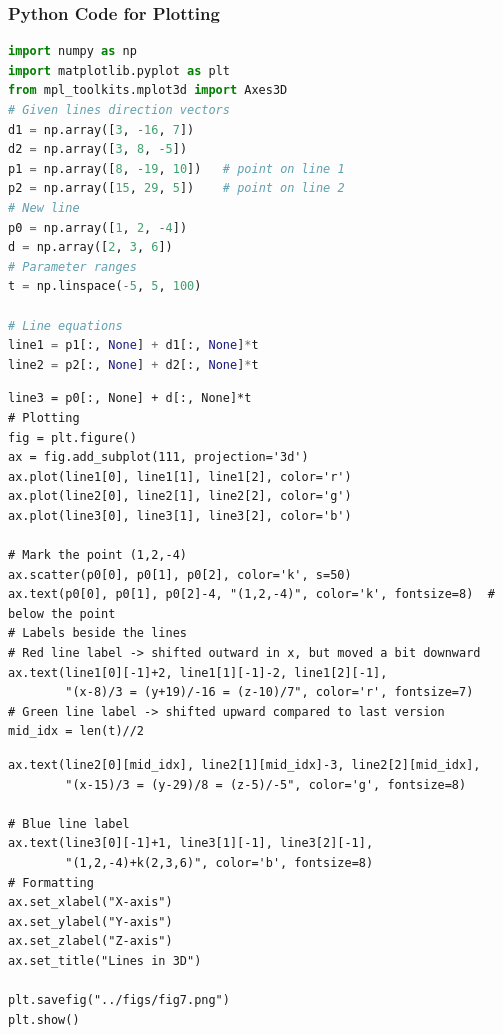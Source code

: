 \documentclass{beamer}
\theoremstyle{remark}
\numberwithin{equation}{section}
\begin{document}
\begin{frame}[fragile]
\frametitle{Python Code for Plotting}
\begin{lstlisting}[language=Python]
import numpy as np
import matplotlib.pyplot as plt
from mpl_toolkits.mplot3d import Axes3D
# Given lines direction vectors
d1 = np.array([3, -16, 7])
d2 = np.array([3, 8, -5])
p1 = np.array([8, -19, 10])   # point on line 1
p2 = np.array([15, 29, 5])    # point on line 2
# New line
p0 = np.array([1, 2, -4])
d = np.array([2, 3, 6])
# Parameter ranges
t = np.linspace(-5, 5, 100)

# Line equations
line1 = p1[:, None] + d1[:, None]*t
line2 = p2[:, None] + d2[:, None]*t
\end{lstlisting}
\end{frame}
\begin{frame}[fragile]
\begin{lstlisting}
line3 = p0[:, None] + d[:, None]*t
# Plotting
fig = plt.figure()
ax = fig.add_subplot(111, projection='3d')
ax.plot(line1[0], line1[1], line1[2], color='r')
ax.plot(line2[0], line2[1], line2[2], color='g')
ax.plot(line3[0], line3[1], line3[2], color='b')

# Mark the point (1,2,-4)
ax.scatter(p0[0], p0[1], p0[2], color='k', s=50)
ax.text(p0[0], p0[1], p0[2]-4, "(1,2,-4)", color='k', fontsize=8)  # below the point
# Labels beside the lines
# Red line label -> shifted outward in x, but moved a bit downward
ax.text(line1[0][-1]+2, line1[1][-1]-2, line1[2][-1],
        "(x-8)/3 = (y+19)/-16 = (z-10)/7", color='r', fontsize=7)
# Green line label -> shifted upward compared to last version
mid_idx = len(t)//2
\end{lstlisting}
\end{frame}
\begin{frame}[fragile]
\begin{lstlisting}
ax.text(line2[0][mid_idx], line2[1][mid_idx]-3, line2[2][mid_idx],
        "(x-15)/3 = (y-29)/8 = (z-5)/-5", color='g', fontsize=8)

# Blue line label
ax.text(line3[0][-1]+1, line3[1][-1], line3[2][-1],
        "(1,2,-4)+k(2,3,6)", color='b', fontsize=8)
# Formatting
ax.set_xlabel("X-axis")
ax.set_ylabel("Y-axis")
ax.set_zlabel("Z-axis")
ax.set_title("Lines in 3D")

plt.savefig("../figs/fig7.png")
plt.show()

\end{lstlisting}
\end{frame}
\end{document}
